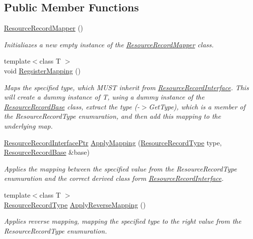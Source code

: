 \subsection*{Public Member Functions}
\begin{DoxyCompactItemize}
\item 
\hyperlink{class_senergy_1_1_dns_1_1_resource_record_mapper_a2442004b11c8561651561074f12cc3c9}{Resource\-Record\-Mapper} ()
\begin{DoxyCompactList}\small\item\em Initialiazes a new empty instance of the \hyperlink{class_senergy_1_1_dns_1_1_resource_record_mapper}{Resource\-Record\-Mapper} class. \end{DoxyCompactList}\item 
{\footnotesize template$<$class T $>$ }\\void \hyperlink{class_senergy_1_1_dns_1_1_resource_record_mapper_a27870caab159dc28b03592fba162ddb0}{Regsister\-Mapping} ()
\begin{DoxyCompactList}\small\item\em Maps the specified type, which M\-U\-S\-T inherit from \hyperlink{class_senergy_1_1_dns_1_1_resource_record_interface}{Resource\-Record\-Interface}. This will create a dummy instance of T, using a dummy instance of the \hyperlink{class_senergy_1_1_dns_1_1_resource_record_base}{Resource\-Record\-Base} class, extract the type (-\/$>$Get\-Type), which is a member of the Resource\-Record\-Type enumuration, and then add this mapping to the underlying map. \end{DoxyCompactList}\item 
\hyperlink{namespace_senergy_1_1_dns_a425b37e088cb64a1bda6205581ade5c8}{Resource\-Record\-Interface\-Ptr} \hyperlink{class_senergy_1_1_dns_1_1_resource_record_mapper_a28d49f50fa6c0703b060ef56f93c5341}{Apply\-Mapping} (\hyperlink{namespace_senergy_1_1_dns_a590bfd748c955364770f5ce358d9dfe0}{Resource\-Record\-Type} type, \hyperlink{class_senergy_1_1_dns_1_1_resource_record_base}{Resource\-Record\-Base} \&base)
\begin{DoxyCompactList}\small\item\em Applies the mapping between the specified value from the Resource\-Record\-Type enumuration and the correct derived class form \hyperlink{class_senergy_1_1_dns_1_1_resource_record_interface}{Resource\-Record\-Interface}. \end{DoxyCompactList}\item 
{\footnotesize template$<$class T $>$ }\\\hyperlink{namespace_senergy_1_1_dns_a590bfd748c955364770f5ce358d9dfe0}{Resource\-Record\-Type} \hyperlink{class_senergy_1_1_dns_1_1_resource_record_mapper_a4a12162b6962aa857c2075ab17ef4375}{Apply\-Reverse\-Mapping} ()
\begin{DoxyCompactList}\small\item\em Applies reverse mapping, mapping the specified type to the right value from the Resource\-Record\-Type enumuration. \end{DoxyCompactList}\end{DoxyCompactItemize}


